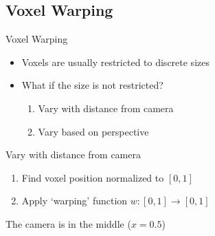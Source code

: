\documentclass[10pt]{beamer}
\begin{document}
\subsection{Voxel Warping}
\begin{frame}{Voxel Warping}
  \begin{itemize}
    \item Voxels are usually restricted to discrete sizes %
    \item What if the size is not restricted?
      \begin{enumerate}
        \item Vary with distance from camera
        \item Vary based on perspective
      \end{enumerate}
  \end{itemize}
\end{frame}

\begin{frame}{Vary with distance from camera}
  \begin{enumerate}
    \item Find voxel position normalized to $[0, 1]$
    \item Apply `warping' function $w: [0, 1] \rightarrow [0, 1]$
  \end{enumerate}

  The camera is in the middle ($x = 0.5$)

  \begin{figure}
  \end{figure}
\end{frame}
\end{document}
